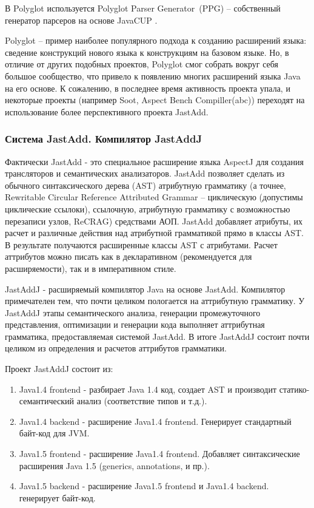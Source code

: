 \documentclass[a4paper,12pt]{article}
\begin{document}
В Polyglot используется Polyglot Parser Generator~(PPG) -- собственный генератор
парсеров на основе JavaCUP \cite{javacup}.

Polyglot -- пример наиболее популярного подхода к созданию расширений языка:
сведение конструкций нового языка к конструкциям на базовом языке. Но, в
отличие от других подобных проектов, Polyglot смог собрать вокруг себя большое
сообщество, что привело к появлению многих расширений языка Java на его основе.
К сожалению, в последнее время активность проекта упала, и некоторые проекты
(например Soot, Aspect Bench Compiller(abc)) переходят на использование более
перспективного проекта JastAdd.

\subsubsection{Система JastAdd. Компилятор JastAddJ}
Фактически JastAdd - это специальное расширение языка AspectJ для создания
трансляторов и семантических анализаторов. JastAdd позволяет сделать из
обычного синтаксического дерева (AST) атрибутную грамматику (а точнее, 
Rewritable Circular Reference Attributed Grammar -- циклическую (допустимы
циклические ссылоки), ссылочную, атрибутную грамматику с возможностью
перезаписи узлов, ReCRAG) средствами АОП. JastAdd добавляет атрибуты, их расчет
и различные действия над атрибутной грамматикой прямо в классы AST. В
результате получаются расширенные классы AST с атрибутами. Расчет аттрибутов
можно писать как в декларативном (рекомендуется для расширяемости), так и в
императивном стиле.

JastAddJ - расширяемый компилятор Java на основе JastAdd. Компилятор
примечателен тем, что почти целиком пологается на аттрибутную грамматику. У
JastAddJ этапы семантического анализа, генерации промежуточного представления,
оптимизации и генерации кода выполняет аттрибутная грамматика, предоставляемая
системой JastAdd. В итоге JastAddJ состоит почти целиком из определения и
расчетов аттрибутов грамматики.

Проект JastAddJ состоит из:
\begin{enumerate}
  \item Java1.4 frontend - разбирает Java 1.4 код, создает AST и производит
  статико-семантический анализ (соответствие типов и т.д.).
  \item Java1.4 backend - расширение Java1.4 frontend. Генерирует стандартный байт-код
  для JVM.
  \item Java1.5 frontend - расширение Java1.4 frontend. Добавляет синтаксические
  расширения Java 1.5 (generics, annotations, и пр.).
  \item Java1.5 backend - расширение Java1.5 frontend и Java1.4 backend. генерирует
  байт-код.
\end{enumerate}
\end{document}
